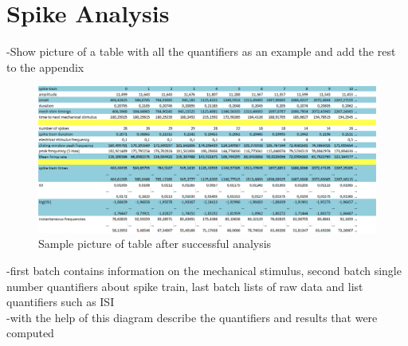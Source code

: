 \section{Spike Analysis}
-Show picture of a table with all the quantifiers as an example and add the rest to the appendix\\
\begin{figure}
	\includegraphics[width = \textwidth]{src/pic/sc_table}
	\caption{Sample picture of table after successful analysis }
	\label{fig:table_sc}
\end{figure}
-first batch contains information on the mechanical stimulus, second batch single number quantifiers about spike train, last batch lists of raw data and list quantifiers such as ISI\\
-with the help of this diagram describe the quantifiers and results that were computed\\








\cleardoublepage
